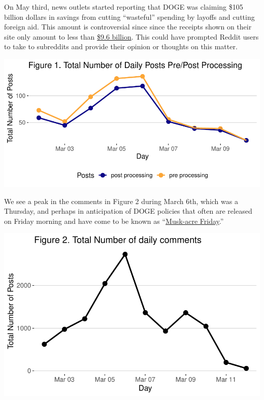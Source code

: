 \documentclass[
  12pt]{article}
\begin{document}
On May third, news outlets started reporting that DOGE was claiming
\$105 billion dollars in savings from cutting ``wasteful'' spending by
layoffs and cutting foreign aid. This amount is controversial since
since the receipts shown on their site only amount to less than
\href{https://abcnews.go.com/US/doge-website-now-saved-105-billion-backtracked-earlier/story?id=119408347}{\$9.6
billion}. This could have prompted Reddit users to take to subreddits
and provide their opinion or thoughts on this matter.

\includegraphics{paper_files/figure-pdf/unnamed-chunk-3-1.pdf}

We see a peak in the comments in Figure 2 during March 6th, which was a
Thursday, and perhaps in anticipation of DOGE policies that often are
released on Friday morning and have come to be known as
``\href{https://smotus.substack.com/p/friday-night-musk-acre}{Musk-acre
Friday}.''

\includegraphics{paper_files/figure-pdf/unnamed-chunk-4-1.pdf}
\end{document}
